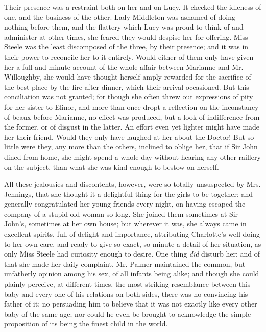 Their presence was a restraint both on her and on Lucy. It checked the idleness of one, and the business of the other. Lady Middleton was ashamed of doing nothing before them, and the flattery which Lucy was proud to think of and administer at other times, she feared they would despise her for offering. Miss Steele was the least discomposed of the three, by their presence; and it was in their power to reconcile her to it entirely. Would either of them only have given her a full and minute account of the whole affair between Marianne and Mr. Willoughby, she would have thought herself amply rewarded for the sacrifice of the best place by the fire after dinner, which their arrival occasioned. But this conciliation was not granted; for though she often threw out expressions of pity for her sister to Elinor, and more than once dropt a reflection on the inconstancy of beaux before Marianne, no effect was produced, but a look of indifference from the former, or of disgust in the latter. An effort even yet lighter might have made her their friend. Would they only have laughed at her about the Doctor! But so little were they, any more than the others, inclined to oblige her, that if Sir John dined from home, she might spend a whole day without hearing any other raillery on the subject, than what she was kind enough to bestow on herself.

All these jealousies and discontents, however, were so totally unsuspected by Mrs. Jennings, that she thought it a delightful thing for the girls to be together; and generally congratulated her young friends every night, on having escaped the company of a stupid old woman so long. She joined them sometimes at Sir John's, sometimes at her own house; but wherever it was, she always came in excellent spirits, full of delight and importance, attributing Charlotte's well doing to her own care, and ready to give so exact, so minute a detail of her situation, as only Miss Steele had curiosity enough to desire. One thing {\em did} disturb her; and of that she made her daily complaint. Mr. Palmer maintained the common, but unfatherly opinion among his sex, of all infants being alike; and though she could plainly perceive, at different times, the most striking resemblance between this baby and every one of his relations on both sides, there was no convincing his father of it; no persuading him to believe that it was not exactly like every other baby of the same age; nor could he even be brought to acknowledge the simple proposition of its being the finest child in the world.


